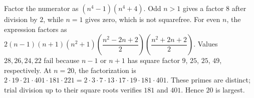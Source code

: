 Factor the numerator as $(n^4-1)(n^4+4)$. Odd $n>1$ gives a factor $8$ after division by $2$, while $n=1$ gives zero, which is not squarefree. For even $n$, the expression factors as $2(n-1)(n+1)(n^2+1)\left(\dfrac{n^2-2n+2}{2}\right)\left(\dfrac{n^2+2n+2}{2}\right)$. Values $28,26,24,22$ fail because $n-1$ or $n+1$ has square factor $9$, $25$, $25$, $49$, respectively. At $n=20$, the factorization is $2\cdot19\cdot21\cdot401\cdot181\cdot221=2\cdot3\cdot7\cdot13\cdot17\cdot19\cdot181\cdot401$. These primes are distinct; trial division up to their square roots verifies $181$ and $401$. Hence $\boxed{20}$ is largest.

